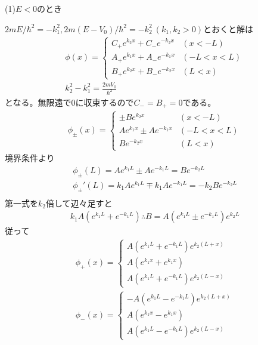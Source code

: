     (1)$E < 0$のとき

    $2mE / \hbar^2 = - k_1^2, 2m(E - V_0) / \hbar^2 = - k_2^2 \ (k_1, k_2 > 0)$とおくと解は
    \begin{align*}
        \phi(x) = 
        \begin{cases}
            C_+ e^{k_2x} + C_- e^{- k_2x} & (x < -L)\\
            A_+ e^{k_1x} + A_- e^{- k_1x} & (-L < x < L)\\
            B_+ e^{k_2x} + B_- e^{- k_2x} & (L < x)
        \end{cases}\\
        k_2^2 - k_1^2 = \frac{2mV_0}{\hbar^2}
    \end{align*}
    となる。無限遠で0に収束するので$C_- = B_+ = 0$である。
    \begin{align*}
        \phi_\pm(x) =
        \begin{cases}
            \pm B e^{k_2x} & (x < -L)\\
            A e^{k_1x} \pm A e^{- k_1x} & (-L < x < L)\\
            B e^{- k_2x} & (L < x)
        \end{cases}
    \end{align*}
    境界条件より
    \begin{align*}
        \phi_\pm(L) = A e^{k_1L} \pm A e^{-k_1L} = B e^{-k_2L}\\
        \phi_\pm'(L) = k_1 A e^{k_1L} \mp k_1 A e^{-k_1L} = -k_2 B e^{-k_2L}\\
    \end{align*}
    第一式を$k_2$倍して辺々足すと
    \begin{align*}
        k_1 A (e^{k_1L} + e^{-k_1L})
        \therefore B = A (e^{k_1L} \pm e^{- k_1L}) e^{k_2L}
    \end{align*}
    従って
    \begin{align*}
        \phi_+(x) =
        \begin{cases}
            A (e^{k_1L} + e^{- k_1L}) e^{k_2(L + x)}\\
            A (e^{k_1x} + e^{k_1x})\\
            A (e^{k_1L} + e^{- k_1L}) e^{k_2(L - x)}
        \end{cases}\\
        \phi_-(x) =
        \begin{cases}
            - A (e^{k_1L} - e^{- k_1L}) e^{k_2(L + x)}\\
            A (e^{k_1x} - e^{k_1x})\\
            A (e^{k_1L} - e^{- k_1L}) e^{k_2(L - x)}
        \end{cases}
    \end{align*}

